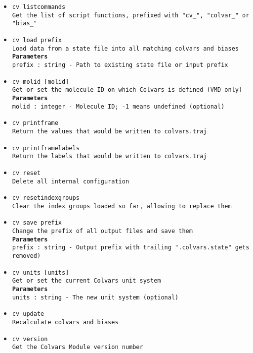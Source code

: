 \begin{itemize}
\item \texttt{cv listcommands}
\\
\texttt{Get the list of script functions, prefixed with "cv\_", "colvar\_" or "bias\_"}
\item \texttt{cv load prefix}
\\
\texttt{Load data from a state file into all matching colvars and biases}
\\
\texttt{\textbf{Parameters}}
\\
\texttt{prefix : string - Path to existing state file or input prefix}
\item \texttt{cv molid [molid]}
\\
\texttt{Get or set the molecule ID on which Colvars is defined (VMD only)}
\\
\texttt{\textbf{Parameters}}
\\
\texttt{molid : integer - Molecule ID; -1 means undefined (optional)}
\item \texttt{cv printframe}
\\
\texttt{Return the values that would be written to colvars.traj}
\item \texttt{cv printframelabels}
\\
\texttt{Return the labels that would be written to colvars.traj}
\item \texttt{cv reset}
\\
\texttt{Delete all internal configuration}
\item \texttt{cv resetindexgroups}
\\
\texttt{Clear the index groups loaded so far, allowing to replace them}
\item \texttt{cv save prefix}
\\
\texttt{Change the prefix of all output files and save them}
\\
\texttt{\textbf{Parameters}}
\\
\texttt{prefix : string - Output prefix with trailing ".colvars.state" gets removed)}
\item \texttt{cv units [units]}
\\
\texttt{Get or set the current Colvars unit system}
\\
\texttt{\textbf{Parameters}}
\\
\texttt{units : string - The new unit system (optional)}
\item \texttt{cv update}
\\
\texttt{Recalculate colvars and biases}
\item \texttt{cv version}
\\
\texttt{Get the Colvars Module version number}
\end{itemize}
